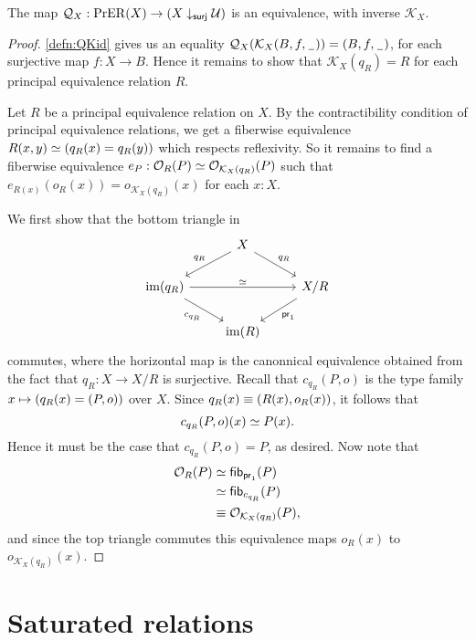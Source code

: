 \begin{thm}\label{thm:PrER_effective}
The map $\mathcal{Q}_X:\mathrm{PrER}(X)\to(X\downarrow_{\mathsf{surj}}\mathcal{U})$ is an equivalence, with inverse $\mathcal{K}_X$.
\end{thm}

\begin{proof}
\autoref{defn:QKid} gives us an equality $\mathcal{Q}_X(\mathcal{K}_X(B,f,\mathord{\hspace{1pt}\underline{\hspace{1ex}}\hspace{1pt}}))={\mathopen{}(B,f,\mathord{\hspace{1pt}\underline{\hspace{1ex}}\hspace{1pt}})\mathclose{}}$, for each surjective map $f:X\to B$. Hence it remains to show that $\mathcal{K}_X(q_R)=R$ for each principal equivalence relation $R$. 

Let $R$ be a principal equivalence relation on $X$. By the contractibility condition of principal equivalence relations, we get a fiberwise equivalence $\eqv{R(x,y)}{(q_R(x)=q_R(y))}$ which respects reflexivity.
So it remains to find a fiberwise equivalence $e_P:\eqv{\mathcal{O}_R(P)}{\mathcal{O}_{\mathcal{K}_X(q_R)}(P)}$ such that $e_{R(x)}(o_R(x))=o_{\mathcal{K}_X(q_R)}(x)$ for each $x:X$.

We first show that the bottom triangle in
\begin{equation*}
\begin{tikzcd} & X \arrow[dl,swap,"q_R"] \arrow[dr,"q_R"] \\
\im(q_R) \arrow[dr,swap,"c_{q_R}"] \arrow[rr,"\eqvsym"] & & X/R \arrow[dl,"\proj1"] \\
& \im(R)
\end{tikzcd}
\end{equation*}
commutes, where the horizontal map is the canonnical equivalence obtained from the fact that $q_R:X\to X/R$ is surjective. Recall that $c_{q_R}(P,o)$ is the type family $x\mapsto (q_R(x)={\mathopen{}(P,o)\mathclose{}})$ over $X$. Since $q_R(x)\equiv{\mathopen{}(R(x),o_R(x))\mathclose{}}$, it follows that
\begin{equation*}
c_{q_R}(P,o)(x)\simeq P(x).
\end{equation*}
Hence it must be the case that $c_{q_R}(P,o)=P$, as desired. Now note that 
\begin{align*}
\mathcal{O}_R(P)
& \simeq \mathsf{fib}_{\mathsf{pr}_{1}}(P) \\
& \simeq \mathsf{fib}_{c_{q_R}}(P) \\
& \equiv \mathcal{O}_{\mathcal{K}_X(q_R)}(P),
\end{align*}
and since the top triangle commutes this equivalence maps $o_R(x)$ to $o_{\mathcal{K}_X(q_R)}(x)$. 
\end{proof}

\section{Saturated relations}

